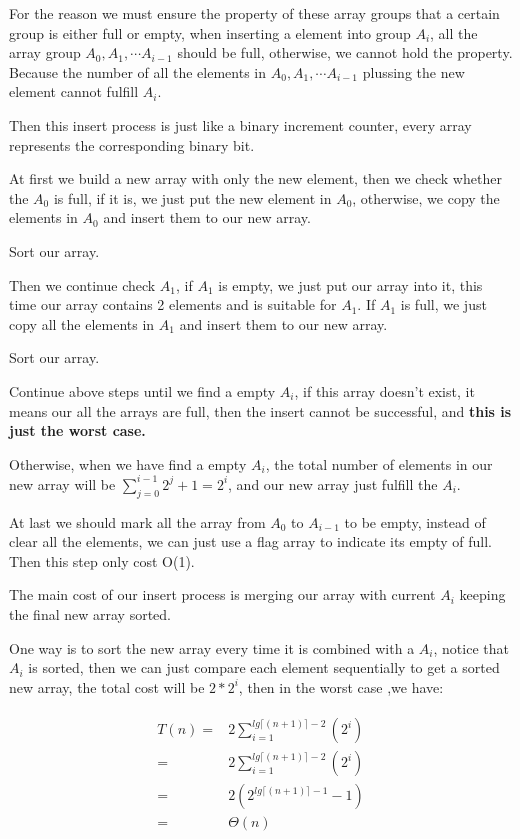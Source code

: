 \documentclass[oneside]{homework} %
\begin{document}
For the reason we must ensure the property of these array groups that a certain group is either full or empty, when inserting a element into group $A_{i}$, all the array group $A_{0},A_{1},\cdots A_{i-1}$ should be full, otherwise, we cannot hold the property. Because the number of all the elements in $A_{0},A_{1},\cdots A_{i-1}$ plussing the new element cannot fulfill $A_{i}$.  

Then this insert process is just like a binary increment counter, every array represents the corresponding binary bit. 

At first we build a new array with only the new element, then we check whether the $A_{0}$ is full, if it is, we just put the new element in $A_{0}$, otherwise, we copy the elements in $A_{0}$ and insert them to our new array. 

Sort our array.

Then we continue check $A_{1}$, if $A_{1}$ is empty, we just put our array into it, this time our array contains 2 elements and is suitable for $A_{1}$. If $A_{1}$ is full, we just copy all the elements in $A_{1}$ and insert them to our new array.  

Sort our array.

Continue above steps until we find a empty $A_{i}$, if this array doesn't exist, it means our all the arrays are full, then the insert cannot be successful, and \textbf{this is just the worst case.} 

Otherwise, when we have find a empty $A_{i}$, the total number of elements in our new array will be $\sum\limits_{j=0}^{i-1}2^{j}+1 = 2^{i}$, and our new array just fulfill the $A_{i}$. 

At last we should mark all the array from $A_{0}$ to $A_{i-1}$ to be empty, instead of clear all the elements, we can just use a flag array to indicate its empty of full. Then this step only cost O(1).

The main cost of our insert process is merging our array with current $A_{i}$ keeping the final new array sorted.

One way is to sort the new array every time it is combined with a $A_{i}$, notice that $A_{i}$ is sorted, then we can just compare each element sequentially to get a sorted new array, the total cost will be $2*2^{i}$, then in the worst case ,we have:

\begin{eqnarray}
  \begin{split}
	T(n) =& 2\sum\limits_{i=1}^{lg\lceil (n+1) \rceil-2}(2^{i}) \\
		 =& 2\sum\limits_{i=1}^{lg\lceil (n+1) \rceil-2}(2^{i}) \\
		 =& 2(2^{lg\lceil (n+1) \rceil-1}-1) \\
		 =& \Theta(n) \\
  \end{split}
  \label{equ:is}
\end{eqnarray}
\end{document}
